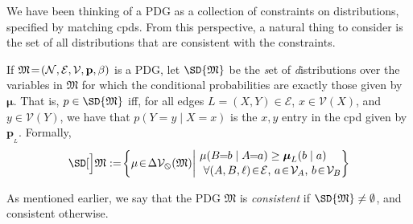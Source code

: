 \documentclass{article}
\theoremstyle{plain}
\theoremstyle{definition}
\theoremstyle{remark}
\newcommand\mat[1]{\mathbf{#1}}
\newcommand{\notation}[2][]{#1}
\renewcommand{\notation}[2][]{{\color{notationcolor} #2}}
\newcommand{\none}{\varobslash}
\def\sheq{\!=\!}
\newcommand{\bp}[1][L]{\mat{p}_{\!_{#1}\!}}
\newcommand{\V}{\mathcal V}
\newcommand{\Ed}{\mathcal E}
\newcommand{\dg}[1]{\mathfrak{#1}}
\newcommand{\MN}{PDG}
\numberwithin{equation}{section}
\begin{document}
	We have been thinking of a PDG as a collection of constraints
        on distributions, specified by matching cpds. From this
                perspective, a natural thing to consider is the set of
        all distributions that are consistent with the constraints.
	

	\begin{defn} \label{def:set-semantics} %
		If $\dg M\sheq\mnvars[]$ is a \MN, let $\SD{\dg M}$ be
                the \emph{s}et of \emph{d}istributions over the
                variables in $\dg M$ 
                for which the conditional probabilities are exactly 
                those given by $\boldsymbol\mu$.
          That is, $p \in \SD{\dg M}$ iff, for all edges $L = (X,Y) \in 
                \Ed$,  $x \in \V(X)$,  and $y \in \V(Y)$, we have that
          $p(Y\sheq y \mid X\sheq x)$ is the $x,y$ entry in the cpd given by
          $\bp$.
		\notation{Formally,		
		\[ \SD[\Big]\dg M := \!\left\{\mu \!\in\! \Delta \V_\none (\dg M) \middle|\!
		\begin{array}{l}
		\mu(B\!\! =\!\!b \mid A\!\!=\!\!a) \geq \boldsymbol\mu_L(b \mid a) \\[0.1em]
		~\text{$\forall (A, B,\ell) \!\in\! \Ed$, $a \!\in\!\mathcal V_A$, $b \!\in\! \mathcal V_B$} \end{array}\!\!\! \right\}\]
		}
	\end{defn}

	As mentioned earlier, we say that the PDG $\dg M$ is \emph{consistent} if
	$\SD{\dg M} \ne \emptyset$, and consistent otherwise.
	
\end{document}
